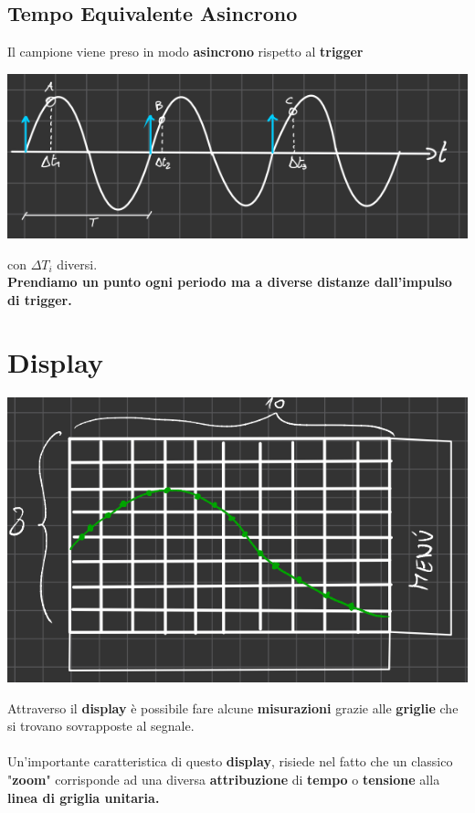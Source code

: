 \subsection{Tempo Equivalente Asincrono}
Il campione viene preso in modo \textbf{asincrono} rispetto al \textbf{trigger}
\begin{center}
    \includegraphics[width=.6\textwidth]{Images/figure21.png}
\end{center}
con $\Delta T_i$ diversi.\\
\textbf{Prendiamo un punto ogni periodo ma a diverse distanze dall'impulso di trigger.
}\section{Display}
\begin{center}
    \includegraphics[width=.6\textwidth]{Images/figure22.png}
\end{center}
Attraverso il \textbf{display} è possibile fare alcune \textbf{misurazioni} grazie alle \textbf{griglie} che si trovano sovrapposte al segnale.\\ \\
Un'importante caratteristica di questo \textbf{display}, risiede nel fatto che un classico "\textbf{zoom}" corrisponde ad una diversa \textbf{attribuzione} di \textbf{tempo} o \textbf{tensione} alla \textbf{linea di griglia unitaria.}